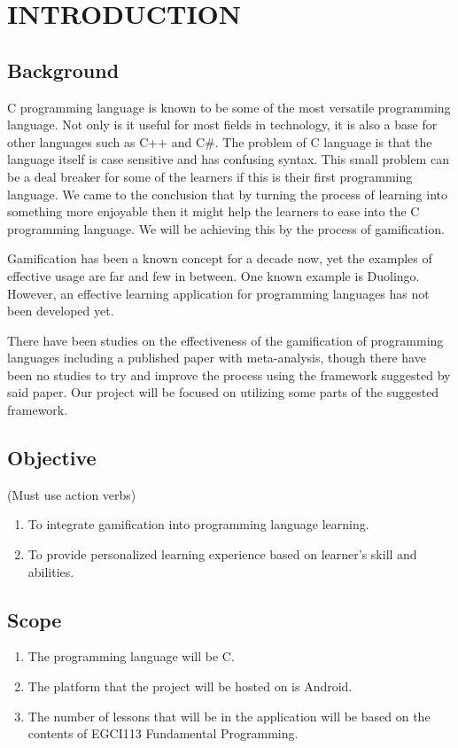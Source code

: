 \chapter{INTRODUCTION}

\section{Background}
C programming language is known to be some of the most versatile programming language. Not only is it useful for most fields in technology, it is also a base for other languages such as C++ and C\#. The problem of C language is that the language itself is case sensitive and has confusing syntax. This small problem can be a deal breaker for some of the learners if this is their first programming language. We came to the conclusion that by turning the process of learning into something more enjoyable then it might help the learners to ease into the C programming language. We will be achieving this by the process of gamification.

Gamification has been a known concept for a decade now, yet the examples of effective usage are far and few in between. One known example is Duolingo. However, an effective learning application for programming languages has not been developed yet. 

There have been studies on the effectiveness of the gamification of programming languages including a published paper with meta-analysis, though there have been no studies to try and improve the process using the framework suggested by said paper. Our project will be focused on utilizing some parts of the suggested framework.
\newpage

\section{Objective}
\noindent\hspace{1.5em}(Must use action verbs)
\begin{enumerate}
	\item To integrate gamification into programming language learning.
	\item To provide personalized learning experience based on learner's skill and abilities.
\end{enumerate}

\section{Scope}
\begin{enumerate}
    \item The programming language will be C.
    \item The platform that the project will be hosted on is Android.
    \item The number of lessons that will be in the application will be based on the contents of EGCI113 Fundamental Programming.
\end{enumerate}

